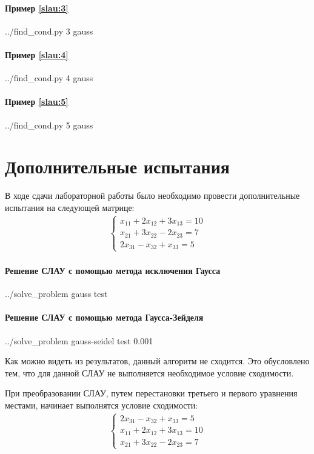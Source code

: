 \documentclass[a4paper]{article}
\begin{document}
\paragraph{Пример \eqref{slau:3}}
\bash[stdout]
../find_cond.py 3 gauss
\END

\paragraph{Пример \eqref{slau:4}}
\bash[stdout]
../find_cond.py 4 gauss
\END

\paragraph{Пример \eqref{slau:5}}
\bash[stdout]
../find_cond.py 5 gauss
\END

\section{Дополнительные испытания}
В ходе сдачи лабораторной работы было необходимо провести дополнительные испытания на следующей матрице:
\begin{align}
    \begin{cases}
        x_{11}+ 2x_{12}  +3x_{13} = 10 \\
        x_{21}+ 3x_{22}  -2x_{23} = 7 \\
        2x_{31} -x_{32}  +x_{33} = 5
    \end{cases}
\end{align}

\paragraph{Решение СЛАУ с помощью метода исключения Гаусса}
\bash[stdout]
../solve_problem gauss test
\END

\paragraph{Решение СЛАУ с помощью метода Гаусса-Зейделя}
\bash[stdout]
../solve_problem gauss-seidel test 0.001
\END

Как можно видеть из результатов, данный алгоритм не сходится. Это обусловлено тем, что для данной СЛАУ не выполняется необходимое условие сходимости.

При преобразовании СЛАУ, путем перестановки третьего и первого уравнения местами, начинает выполнятся условие сходимости:
\begin{align}
    \begin{cases}
        2x_{31} -x_{32}  +x_{33} = 5 \\
        x_{11}+ 2x_{12}  +3x_{13} = 10 \\
        x_{21}+ 3x_{22}  -2x_{23} = 7
    \end{cases}
\end{align}
\end{document}
